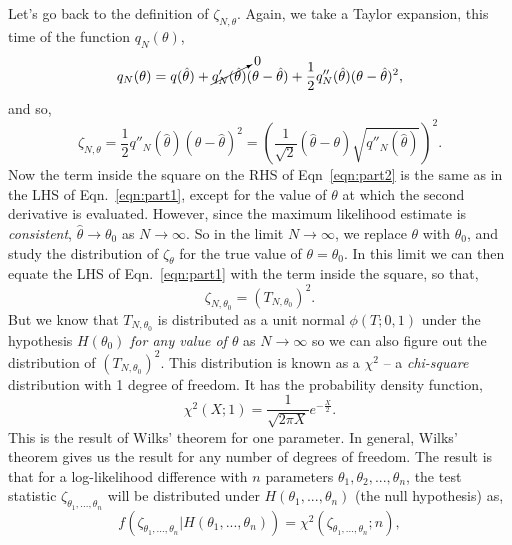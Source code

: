 Let's go back to the definition of $\zeta_{N,\theta}.$ Again, we take a Taylor expansion, this time of the function $q_{N}(\theta)$,
\begin{equation}\label{eqn:taylor_exp_qN}
    q_{N}(\theta) = q(\hat\theta) + \cancelto{0}{q'_{N}(\hat{\theta})}(\theta-\hat{\theta}) + \frac{1}{2}q''_{N}(\hat\theta)(\theta-\hat{\theta})^2,
\end{equation}
and so, 
\begin{equation}\label{eqn:part2}
    \zeta_{N,\theta} =  \frac{1}{2}q''_{N}(\hat\theta)(\theta-\hat{\theta})^2 = \left( \frac{1}{\sqrt{2}}(\hat{\theta}-{\theta})\sqrt{q''_{N}(\hat\theta)}\right)^2. 
\end{equation}
Now the term inside the square on the RHS of Eqn~\ref{eqn:part2} is the same as in the LHS of Eqn.~\ref{eqn:part1}, except for the value of $\theta$ at which the second derivative is evaluated. However, since the maximum likelihood estimate is \emph{consistent}, $\hat\theta\rightarrow \theta_{0}$ as $N\rightarrow \infty$. So in the limit $N\rightarrow \infty$, we replace $\theta$ with $\theta_{0}$, and study the distribution of $\zeta_{\theta}$ for the true value of $\theta=\theta_{0}$. In this limit we can then equate the LHS of Eqn.~\ref{eqn:part1} with the term inside the square, so that, 
\begin{equation}
    \zeta_{N,\theta_0} = (T_{N,\theta_{0}})^2.
\end{equation}
But we know that $T_{N,\theta_0}$ is distributed as a unit normal $\phi(T;0,1)$ under the hypothesis $H(\theta_0)$ \emph{for any value of $\theta$} as $N\rightarrow \infty$ so we can also figure out the distribution of $(T_{N,\theta_{0}})^2$. This distribution is known as a $\chi^{2}$ -- a \emph{chi-square} distribution with 1 degree of freedom. It has the probability density function, 
\begin{equation}
    \chi^{2}(X;1) = \frac{1}{\sqrt{2\pi X}}e^{-\frac{X}{2}}.
\end{equation}
This is the result of Wilks' theorem for one parameter. In general, Wilks' theorem gives us the result for any number of degrees of freedom. The result is that for a log-likelihood difference with $n$ parameters $\theta_{1},\theta_{2},...,\theta_{n}$, the test statistic $\zeta_{\theta_{1},...,\theta_{n}}$ will be distributed under $H(\theta_{1},...,\theta_{n})$ (the null hypothesis) as, 
\begin{equation}
  f(\zeta_{\theta_{1},...,\theta_{n}}|H(\theta_{1},...,\theta_{n})) = \chi^{2}(\zeta_{\theta_{1},...,\theta_{n}};n),
\end{equation}
